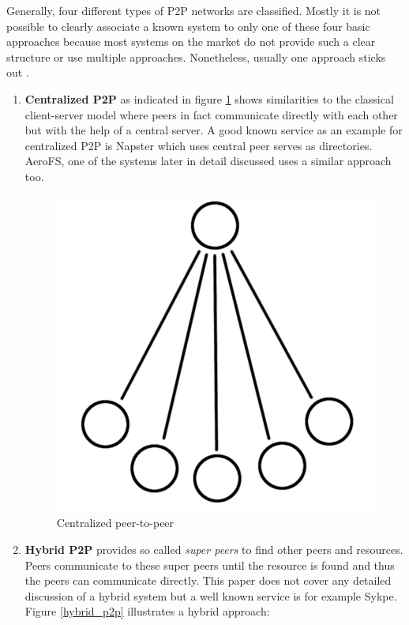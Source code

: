 Generally, four different types of P2P networks are classified. Mostly it is not possible to clearly associate a known system to only one of these four basic approaches because most systems on the market do not provide such a clear structure or use multiple approaches. Nonetheless, usually one approach sticks out \cite{ptp-introduction:tomptp}.
\begin{enumerate}
	\item \textbf{Centralized P2P} as indicated in figure \ref{centralized_p2p} shows similarities to the classical client-server model where peers in fact communicate directly with each other but with the help of a central server. A good known service as an example for centralized P2P is Napster which uses central peer serves as directories. AeroFS, one of the systems later in detail discussed uses a similar approach too.
	\begin{figure}[H]
		\begin{center}
		\includegraphics[scale=0.2]{Talk5/centralized_p2p.PNG}
		\end{center}
		\caption{Centralized peer-to-peer}
		\label{centralized_p2p}
	\end{figure}
	\item \textbf{Hybrid P2P} provides so called \textit{super peers} to find other peers and resources. Peers communicate to these super peers until the resource is found and thus the peers can communicate directly. This paper does not cover any detailed discussion of a hybrid system but a well known service is for example Sykpe. Figure \ref{hybrid_p2p} illustrates a hybrid approach:

\end{enumerate}
